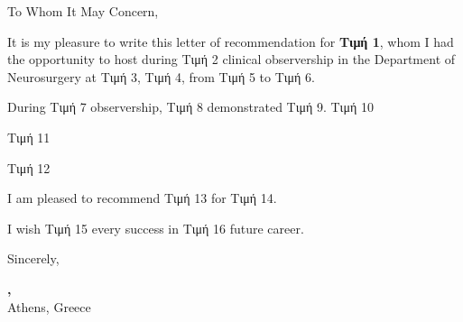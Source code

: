 \documentclass[10pt,british]{article}
\begin{document}
\noindent To Whom It May Concern,

It is my pleasure to write this letter of recommendation for \textbf{Τιμή 1}, whom I had the opportunity to host during Τιμή 2 clinical observership in the Department of Neurosurgery at Τιμή 3, Τιμή 4, from Τιμή 5 to Τιμή 6.

During Τιμή 7 observership, Τιμή 8 demonstrated Τιμή 9. Τιμή 10

Τιμή 11

Τιμή 12

I am pleased to recommend Τιμή 13 for Τιμή 14.

I wish Τιμή 15 every success in Τιμή 16 future career.

\vspace{1em}
\noindent Sincerely,

\vspace{2em}
\noindent\textbf{\DrName, \DrDegree}\\
Athens, Greece
\end{document}
